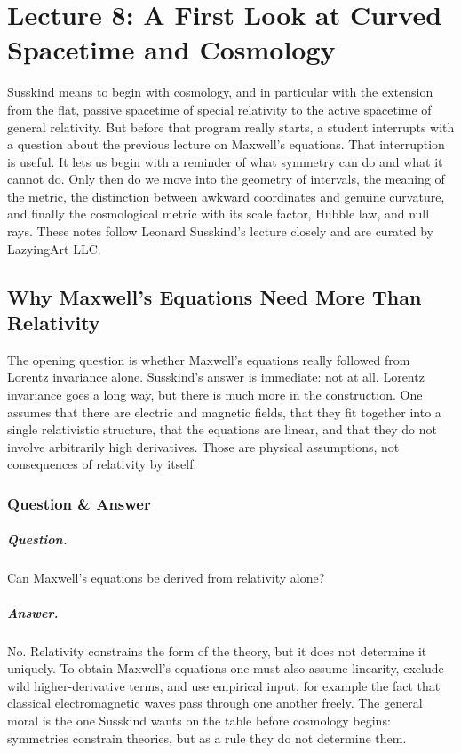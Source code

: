 \chapter{Lecture 8: A First Look at Curved Spacetime and Cosmology}

Susskind means to begin with cosmology, and in particular with the extension from the flat, passive spacetime of special relativity to the active spacetime of general relativity. But before that program really starts, a student interrupts with a question about the previous lecture on Maxwell's equations. That interruption is useful. It lets us begin with a reminder of what symmetry can do and what it cannot do. Only then do we move into the geometry of intervals, the meaning of the metric, the distinction between awkward coordinates and genuine curvature, and finally the cosmological metric with its scale factor, Hubble law, and null rays. These notes follow Leonard Susskind's lecture closely and are curated by LazyingArt LLC.

\section{Why Maxwell's Equations Need More Than Relativity}

The opening question is whether Maxwell's equations really followed from Lorentz invariance alone. Susskind's answer is immediate: not at all. Lorentz invariance goes a long way, but there is much more in the construction. One assumes that there are electric and magnetic fields, that they fit together into a single relativistic structure, that the equations are linear, and that they do not involve arbitrarily high derivatives. Those are physical assumptions, not consequences of relativity by itself.

\subsection{Question \& Answer}

\paragraph{Question.} Can Maxwell's equations be derived from relativity alone?

\paragraph{Answer.} No. Relativity constrains the form of the theory, but it does not determine it uniquely. To obtain Maxwell's equations one must also assume linearity, exclude wild higher-derivative terms, and use empirical input, for example the fact that classical electromagnetic waves pass through one another freely. The general moral is the one Susskind wants on the table before cosmology begins: symmetries constrain theories, but as a rule they do not determine them.

